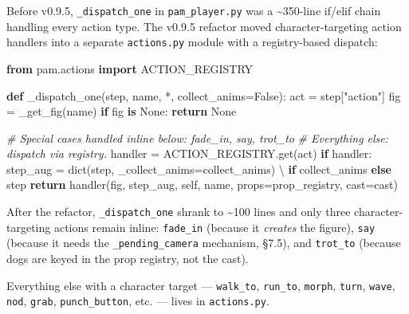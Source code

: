 \documentclass[
  12pt,
  letterpaper,
]{book}
\newenvironment{Shaded}{}{}
\newcommand{\BuiltInTok}[1]{\textcolor[rgb]{0.00,0.50,0.00}{#1}}
\newcommand{\CommentTok}[1]{\textcolor[rgb]{0.38,0.63,0.69}{\textit{#1}}}
\newcommand{\ControlFlowTok}[1]{\textcolor[rgb]{0.00,0.44,0.13}{\textbf{#1}}}
\newcommand{\ImportTok}[1]{\textcolor[rgb]{0.00,0.50,0.00}{\textbf{#1}}}
\newcommand{\KeywordTok}[1]{\textcolor[rgb]{0.00,0.44,0.13}{\textbf{#1}}}
\newcommand{\NormalTok}[1]{#1}
\newcommand{\OperatorTok}[1]{\textcolor[rgb]{0.40,0.40,0.40}{#1}}
\newcommand{\StringTok}[1]{\textcolor[rgb]{0.25,0.44,0.63}{#1}}
\newcommand{\VariableTok}[1]{\textcolor[rgb]{0.10,0.09,0.49}{#1}}
\begin{document}
Before v0.9.5, \texttt{\_dispatch\_one} in \texttt{pam\_player.py} was a
\textasciitilde350-line if/elif chain handling every action type. The
v0.9.5 refactor moved character-targeting action handlers into a
separate \texttt{actions.py} module with a registry-based dispatch:

\begin{Shaded}
\begin{Highlighting}[]
\ImportTok{from}\NormalTok{ pam.actions }\ImportTok{import}\NormalTok{ ACTION\_REGISTRY}

\KeywordTok{def}\NormalTok{ \_dispatch\_one(step, name, }\OperatorTok{*}\NormalTok{, collect\_anims}\OperatorTok{=}\VariableTok{False}\NormalTok{):}
\NormalTok{    act }\OperatorTok{=}\NormalTok{ step[}\StringTok{"action"}\NormalTok{]}
\NormalTok{    fig }\OperatorTok{=}\NormalTok{ \_get\_fig(name)}
    \ControlFlowTok{if}\NormalTok{ fig }\KeywordTok{is} \VariableTok{None}\NormalTok{:}
        \ControlFlowTok{return} \VariableTok{None}

    \CommentTok{\# Special cases handled inline below: fade\_in, say, trot\_to}
    \CommentTok{\# Everything else: dispatch via registry.}
\NormalTok{    handler }\OperatorTok{=}\NormalTok{ ACTION\_REGISTRY.get(act)}
    \ControlFlowTok{if}\NormalTok{ handler:}
\NormalTok{        step\_aug }\OperatorTok{=} \BuiltInTok{dict}\NormalTok{(step, \_collect\_anims}\OperatorTok{=}\NormalTok{collect\_anims) }\OperatorTok{\textbackslash{}}
                   \ControlFlowTok{if}\NormalTok{ collect\_anims }\ControlFlowTok{else}\NormalTok{ step}
        \ControlFlowTok{return}\NormalTok{ handler(fig, step\_aug, }\VariableTok{self}\NormalTok{, name,}
\NormalTok{                       props}\OperatorTok{=}\NormalTok{prop\_registry, cast}\OperatorTok{=}\NormalTok{cast)}
\end{Highlighting}
\end{Shaded}

After the refactor, \texttt{\_dispatch\_one} shrank to
\textasciitilde100 lines and only three character-targeting actions
remain inline: \texttt{fade\_in} (because it \emph{creates} the figure),
\texttt{say} (because it needs the \texttt{\_pending\_camera} mechanism,
§7.5), and \texttt{trot\_to} (because dogs are keyed in the prop
registry, not the cast).

Everything else with a character target --- \texttt{walk\_to},
\texttt{run\_to}, \texttt{morph}, \texttt{turn}, \texttt{wave},
\texttt{nod}, \texttt{grab}, \texttt{punch\_button}, etc. --- lives in
\texttt{actions.py}.
\end{document}
